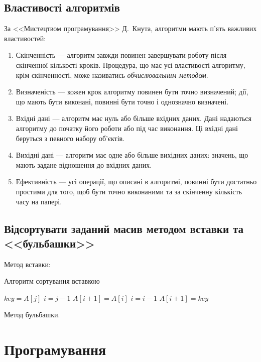 \documentclass[a4paper,oneside,DIV=12,fontsize=12pt, headings=small]{scrartcl}
\begin{document}
		\subsection{Властивості алгоритмів}
			За <<Мистецтвом програмування>> Д.~Кнута, алгоритми мають п'ять важливих властивостей:
			\begin{enumerate}
				\item Скінченність --- алгоритм завжди повинен завершувати роботу після скінченної кількості кроків. Процедура, що має усі властивості алгоритму, крім скінченності, може називатись \emph{обчислювальним методом}.
				\item Визначеність --- кожен крок алгоритму повинен бути точно визначений; дії, що мають бути виконані, повинні бути точно і однозначно визначені.
				\item Вхідні дані --- алгоритм має нуль або більше вхідних даних. Дані надаються алгоритму до початку його роботи або під час виконання. Ці вхідні дані беруться з певного набору об'єктів.
				\item Вихідні дані --- алгоритм має одне або більше вихідних даних: значень, що мають задане відношення до вхідних даних.
				\item Ефективність --- усі операції, що описані в алгоритмі, повинні бути достатньо простими для того, щоб бути точно виконаними та за скінченну кількість часу на папері.
			\end{enumerate}
			
		\subsection{Відсортувати заданий масив методом вставки та <<бульбашки>>}
			Метод вставки:
			
			\begin{algorithm}
				\caption{Алгоритм сортування вставкою}
				
				\begin{algorithmic}[1]
						\State $key = A[j]$
						\State $i = j - 1$
							\State $A[i+1] = A[i]$
							\State $i = i - 1$
						\EndWhile
						\State $A[i+1] = key$
					\EndFor
				\end{algorithmic}
				
			\end{algorithm}
			
			Метод бульбашки.
	\section{Програмування}
\end{document}
